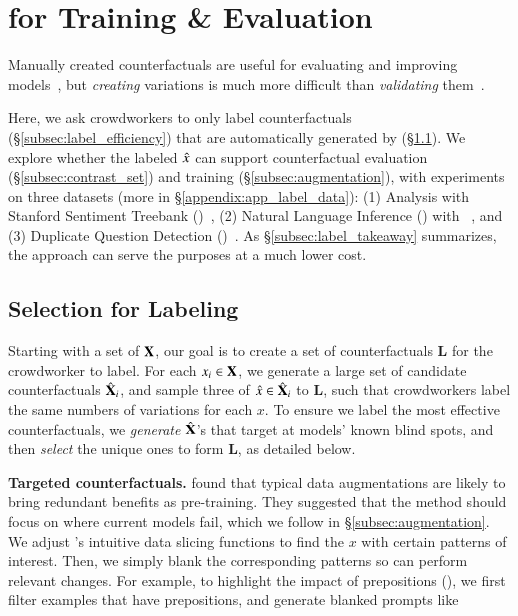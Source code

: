 \section{\sysname for Training \& Evaluation}
\label{sec:app_label}
Manually created counterfactuals are useful for evaluating and improving models~\cite{gardner2020contrast,kaushik2019learning}, but \emph{creating} variations is much more difficult than \emph{validating} them~\cite{ribeiro2018sear}.

Here, we ask crowdworkers to only label counterfactuals (\S\ref{subsec:label_efficiency}) that are automatically generated by \sysname (\S\ref{subsec:gen_counterfactual_for_labeling}).
We explore whether the labeled $\hat{x}$ can support counterfactual evaluation (\S\ref{subsec:contrast_set}) and training (\S\ref{subsec:augmentation}), with experiments on three datasets (more in \S\ref{appendix:app_label_data}):
(1) \sst Analysis with Stanford Sentiment Treebank (\dsst)~\cite{socher2013recursive},
(2) Natural Language Inference (\nli) with \dnli~\cite{bowman-etal-2015-large}, and 
(3) Duplicate Question Detection (\dqqp)~\cite{wang2018glue}.
As \S\ref{subsec:label_takeaway} summarizes, the approach can serve the purposes at a much lower cost.


\subsection{Selection for Labeling}
\label{subsec:gen_counterfactual_for_labeling}


Starting with a set of $\mathbf{X}$, our goal is to create a set of counterfactuals $\mathbf{L}$ for the crowdworker to label.
For each $x_i \in \mathbf{X}$, we generate a large set of candidate counterfactuals $\hat{\mathbf{X}}_i$, and sample three of $\hat{x} \in \hat{\mathbf{X}}_i$ to $\mathbf{L}$, such that crowdworkers label the same numbers of variations for each $x$.
To ensure we label the most effective counterfactuals, we \emph{generate} $\hat{\mathbf{X}}$'s that target at models' known blind spots, and then \emph{select} the unique ones to form $\mathbf{L}$, as detailed below.

\textbf{Targeted counterfactuals.}
\citet{longpre2020effective} found that typical data augmentations are likely to bring redundant benefits as pre-training.
They suggested that the method should focus on where current models fail, which we follow in \S\ref{subsec:augmentation}.
We adjust \citet{chen2019slice}'s intuitive data slicing functions to find the $x$ with certain patterns of interest.
Then, we simply blank the corresponding patterns so \sysname can perform relevant changes.
For example, to highlight the impact of prepositions (), we first filter examples that have prepositions, and generate blanked prompts like 


